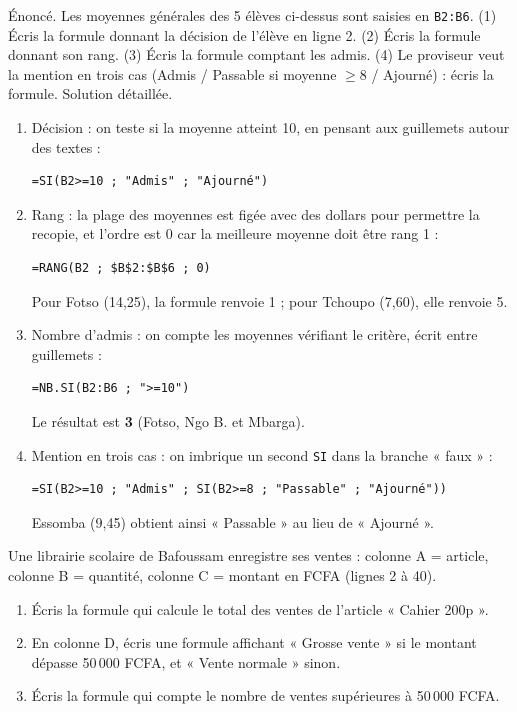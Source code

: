 \documentclass[11pt]{article}
\begin{document}
\begin{exoresolu}
Énoncé. Les moyennes générales des 5 élèves ci-dessus sont saisies en \texttt{B2:B6}. (1) Écris la formule donnant la décision de l'élève en ligne 2. (2) Écris la formule donnant son rang. (3) Écris la formule comptant les admis. (4) Le proviseur veut la mention en trois cas (Admis / Passable si moyenne $\geq 8$ / Ajourné) : écris la formule.
\tcblower
Solution détaillée.
\begin{enumerate}
  \item Décision : on teste si la moyenne atteint 10, en pensant aux guillemets autour des textes :
\begin{lstlisting}
=SI(B2>=10 ; "Admis" ; "Ajourné")
\end{lstlisting}
  \item Rang : la plage des moyennes est figée avec des dollars pour permettre la recopie, et l'ordre est 0 car la meilleure moyenne doit être rang 1 :
\begin{lstlisting}
=RANG(B2 ; $B$2:$B$6 ; 0)
\end{lstlisting}
Pour Fotso (14,25), la formule renvoie 1 ; pour Tchoupo (7,60), elle renvoie 5.
  \item Nombre d'admis : on compte les moyennes vérifiant le critère, écrit entre guillemets :
\begin{lstlisting}
=NB.SI(B2:B6 ; ">=10")
\end{lstlisting}
Le résultat est \textbf{3} (Fotso, Ngo B. et Mbarga).
  \item Mention en trois cas : on imbrique un second \texttt{SI} dans la branche « faux » :
\begin{lstlisting}
=SI(B2>=10 ; "Admis" ; SI(B2>=8 ; "Passable" ; "Ajourné"))
\end{lstlisting}
Essomba (9,45) obtient ainsi « Passable » au lieu de « Ajourné ».
\end{enumerate}
\end{exoresolu}

\begin{exercice}
Une librairie scolaire de Bafoussam enregistre ses ventes : colonne A = article, colonne B = quantité, colonne C = montant en FCFA (lignes 2 à 40).
\begin{enumerate}
  \item Écris la formule qui calcule le total des ventes de l'article « Cahier 200p ».
  \item En colonne D, écris une formule affichant « Grosse vente » si le montant dépasse 50\,000 FCFA, et « Vente normale » sinon.
  \item Écris la formule qui compte le nombre de ventes supérieures à 50\,000 FCFA.
\end{enumerate}
\end{exercice}
\end{document}
